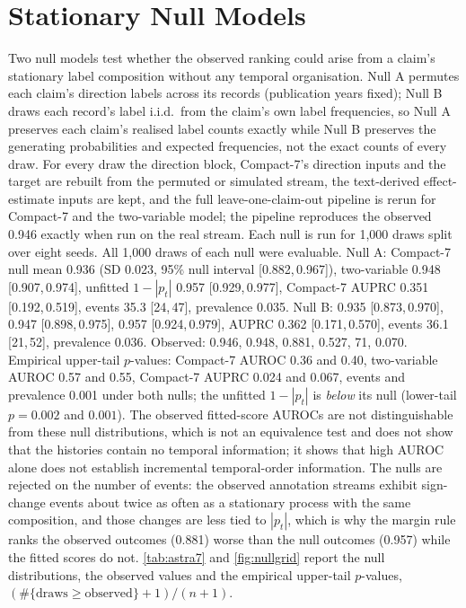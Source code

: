 \documentclass[11pt]{article}
\newcommand{\compact}{Compact-7\xspace}
\newcommand{\ci}[2]{[#1,\,#2]}
\begin{document}
\section{Stationary Null Models}
\label{app:null}
Two null models test whether the observed ranking could arise from a claim's stationary label
composition without any temporal organisation. Null A permutes each claim's direction labels
across its records (publication years fixed); Null B draws each record's label i.i.d.\ from the
claim's own label frequencies, so Null A preserves each claim's realised label counts exactly while
Null B preserves the generating probabilities and expected frequencies, not the exact counts of
every draw. For every draw the direction block, \compact's
direction inputs and the target are rebuilt from the permuted or simulated stream, the text-derived
effect-estimate inputs are kept, and the full leave-one-claim-out pipeline is rerun for \compact
and the two-variable model; the pipeline reproduces the observed 0.946 exactly when run on the
real stream. Each null is run for 1{,}000 draws split over eight seeds. All 1{,}000 draws of each null were evaluable. Null A: \compact null mean 0.936 (SD 0.023,
95\% null interval \ci{0.882}{0.967}), two-variable 0.948 \ci{0.907}{0.974}, unfitted $1-|p_t|$
0.957 \ci{0.929}{0.977}, \compact AUPRC 0.351 \ci{0.192}{0.519}, events 35.3 \ci{24}{47},
prevalence 0.035. Null B: 0.935 \ci{0.873}{0.970},
0.947 \ci{0.898}{0.975}, 0.957 \ci{0.924}{0.979}, AUPRC 0.362 \ci{0.171}{0.570}, events 36.1
\ci{21}{52}, prevalence 0.036. Observed: 0.946, 0.948, 0.881, 0.527,
71, 0.070. Empirical upper-tail $p$-values: \compact AUROC 0.36 and 0.40,
two-variable AUROC 0.57 and 0.55, \compact AUPRC 0.024 and 0.067, events and prevalence 0.001 under both
nulls; the unfitted $1-|p_t|$ is
\emph{below} its null (lower-tail $p=0.002$ and $0.001$). The observed fitted-score AUROCs are not distinguishable from these null distributions, which
is not an equivalence test and does not show that the histories contain no temporal information;
it shows that high AUROC alone does not establish incremental temporal-order information. The
nulls are rejected on the number of events: the observed annotation streams exhibit sign-change events about twice as often as a stationary process with the same
composition, and those changes are less tied to $|p_t|$, which is why the margin rule ranks the
observed outcomes (0.881) worse than the null outcomes (0.957) while the fitted scores do not.
\cref{tab:astra7} and \cref{fig:nullgrid} report the null distributions, the observed
values and the empirical upper-tail $p$-values, $(\#\{\text{draws}\ge\text{observed}\}+1)/(n+1)$.
\end{document}
